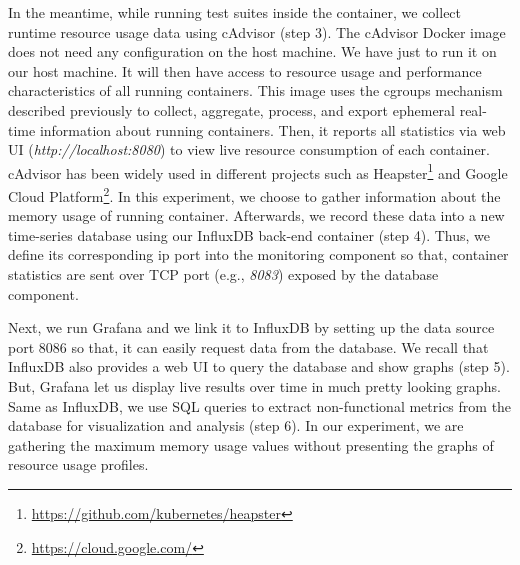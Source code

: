 In the meantime, while running test suites inside the container, we collect runtime resource usage data using cAdvisor (step 3). The cAdvisor Docker image does not need any configuration on the host machine. We have just to run it on our host machine. It will then have access to resource usage and performance characteristics of all running containers. This image uses the cgroups mechanism described previously to collect, aggregate, process, and export ephemeral real-time information about running containers. Then, it reports all statistics via web UI (\textit{http://localhost:8080}) to view live resource consumption of each container. cAdvisor has been widely used in different projects such as Heapster\footnote{\url{https://github.com/kubernetes/heapster}} and Google Cloud Platform\footnote{\url{https://cloud.google.com/}}. In this experiment, we choose to gather information about the memory usage of running container.
Afterwards, we record these data into a new time-series database using our InfluxDB back-end container (step 4). Thus, we define its corresponding ip port into the monitoring component so that, container statistics are sent over TCP port (e.g., \textit{8083}) exposed by the database component. 

Next, we run Grafana and we link it to InfluxDB by setting up the data source port 8086 so that, it can easily request data from the database. We recall that InfluxDB also provides a web UI to query the database and show graphs (step 5). But, Grafana let us display live results over time in much pretty looking graphs. Same as InfluxDB, we use SQL queries to extract non-functional metrics from the database for visualization and analysis (step 6). In our experiment, we are gathering the maximum memory usage values without presenting the graphs of resource usage profiles.
 
 


